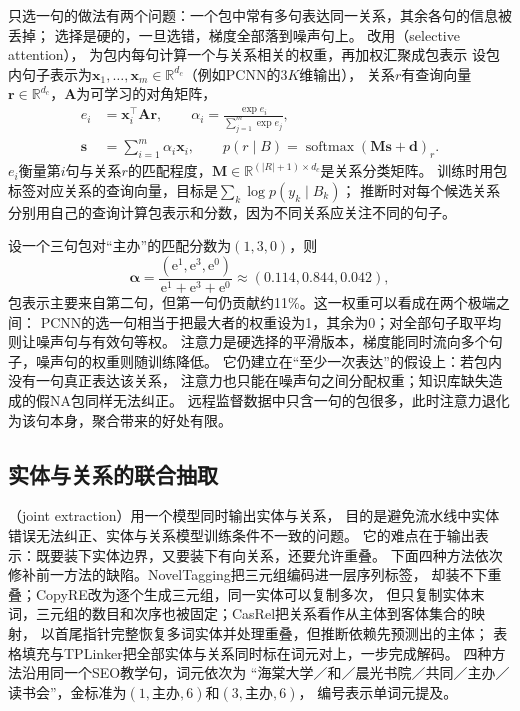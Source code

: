 只选一句的做法有两个问题：一个包中常有多句表达同一关系，其余各句的信息被丢掉；
选择是硬的，一旦选错，梯度全部落到噪声句上。
\citeauthor{lin2016selective}改用（selective attention），
为包内每句计算一个与关系相关的权重，再加权汇聚成包表示
设包内句子表示为$\bm{x}_1,\ldots,\bm{x}_m\in\mathbb{R}^{d_c}$（例如PCNN的$3K$维输出），
关系$r$有查询向量$\bm{r}\in\mathbb{R}^{d_c}$，$\bm{A}$为可学习的对角矩阵，
\begin{equation}
  \begin{aligned}
    e_i&=\bm{x}_i^{\top}\bm{A}\bm{r},\qquad
    \alpha_i=\frac{\exp e_i}{\sum_{j=1}^{m}\exp e_j},\\
    \bm{s}&=\sum_{i=1}^{m}\alpha_i\bm{x}_i,\qquad
    p(r\mid B)=\operatorname{softmax}(\bm{M}\bm{s}+\bm{d})_r.
  \end{aligned}
  \label{eq:nlp-extraction-selective-attention}
\end{equation}
$e_i$衡量第$i$句与关系$r$的匹配程度，$\bm{M}\in\mathbb{R}^{(|R|+1)\times d_c}$是关系分类矩阵。
训练时用包标签对应关系的查询向量，目标是$\sum_k\log p(y_k\mid B_k)$；
推断时对每个候选关系分别用自己的查询计算包表示和分数，因为不同关系应关注不同的句子。

设一个三句包对“主办”的匹配分数为$(1,3,0)$，则
\[
  \bm{\alpha}=\frac{(\mathrm{e}^{1},\mathrm{e}^{3},\mathrm{e}^{0})}
  {\mathrm{e}^{1}+\mathrm{e}^{3}+\mathrm{e}^{0}}\approx(0.114,0.844,0.042),
\]
包表示主要来自第二句，但第一句仍贡献约11\%。这一权重可以看成在两个极端之间：
PCNN的选一句相当于把最大者的权重设为1，其余为0；对全部句子取平均则让噪声句与有效句等权。
注意力是硬选择的平滑版本，梯度能同时流向多个句子，噪声句的权重则随训练降低。
它仍建立在“至少一次表达”的假设上：若包内没有一句真正表达该关系，
注意力也只能在噪声句之间分配权重；知识库缺失造成的假NA包同样无法纠正。
远程监督数据中只含一句的包很多，此时注意力退化为该句本身，聚合带来的好处有限。

\subsection{实体与关系的联合抽取}
\label{sec:nlp-extraction-joint}

（joint extraction）用一个模型同时输出实体与关系，
目的是避免流水线中实体错误无法纠正、实体与关系模型训练条件不一致的问题。
它的难点在于输出表示：既要装下实体边界，又要装下有向关系，还要允许重叠。
下面四种方法依次修补前一方法的缺陷。NovelTagging把三元组编码进一层序列标签，
却装不下重叠；CopyRE改为逐个生成三元组，同一实体可以复制多次，
但只复制实体末词，三元组的数目和次序也被固定；CasRel把关系看作从主体到客体集合的映射，
以首尾指针完整恢复多词实体并处理重叠，但推断依赖先预测出的主体；
表格填充与TPLinker把全部实体与关系同时标在词元对上，一步完成解码。
四种方法沿用同一个SEO教学句，词元依次为
“海棠大学／和／晨光书院／共同／主办／读书会”，金标准为$(1,\text{主办},6)$和$(3,\text{主办},6)$，
编号表示单词元提及。

